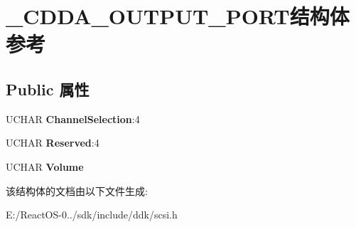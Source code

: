 \hypertarget{struct___c_d_d_a___o_u_t_p_u_t___p_o_r_t}{}\section{\+\_\+\+C\+D\+D\+A\+\_\+\+O\+U\+T\+P\+U\+T\+\_\+\+P\+O\+R\+T结构体 参考}
\label{struct___c_d_d_a___o_u_t_p_u_t___p_o_r_t}
\subsection*{Public 属性}
\begin{DoxyCompactItemize}
\item 
\mbox{\label{struct___c_d_d_a___o_u_t_p_u_t___p_o_r_t_a06f1a385242bce50db561232f9edc47b}} 
U\+C\+H\+AR {\bfseries Channel\+Selection}\+:4
\item 
\mbox{\label{struct___c_d_d_a___o_u_t_p_u_t___p_o_r_t_a01d4f8c191347bbe4e70d57166c6e948}} 
U\+C\+H\+AR {\bfseries Reserved}\+:4
\item 
\mbox{\label{struct___c_d_d_a___o_u_t_p_u_t___p_o_r_t_a213486c56670d89175dfbd9dc633cdcc}} 
U\+C\+H\+AR {\bfseries Volume}
\end{DoxyCompactItemize}


该结构体的文档由以下文件生成\+:\begin{DoxyCompactItemize}
\item 
E\+:/\+React\+O\+S-\/0../sdk/include/ddk/scsi.\+h\end{DoxyCompactItemize}
